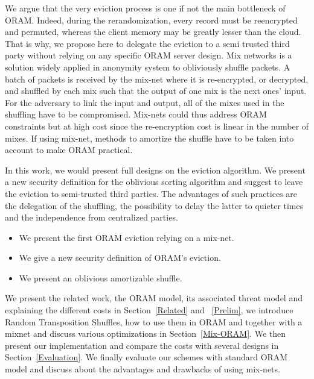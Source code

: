 \documentclass{llncs}
\begin{document}
We argue that the very eviction process is one if not the main bottleneck of ORAM. Indeed, during the rerandomization, every record must be reencrypted and permuted, whereas the client memory may be greatly lesser than the cloud. That is why, we propose here to delegate the eviction to a semi trusted third party without relying on any specific ORAM server design.
Mix networks is a solution widely applied in anonymity system to obliviously shuffle packets. A batch of packets is received by the mix-net where it is re-encrypted, or decrypted, and shuffled by each mix such that the output of one mix is the next ones' input.
For the adversary to link the input and output, all of the mixes used in the shuffling have to be compromised.
Mix-nets could thus address ORAM constraints but at high cost since the re-encryption cost is linear in the number of mixes. If using mix-net, methods to amortize the shuffle have to be taken into account to make ORAM practical.

In this work, we would present full designs on the eviction algorithm. We present a new security definition for the oblivious sorting algorithm and suggest to leave the eviction to semi-trusted third parties.
The advantages of such practices are the delegation of the shuffling, the possibility to delay the latter to quieter times and the independence from centralized parties.

\begin{itemize}
 \item We present the first ORAM eviction relying on a mix-net.
 \item We give a new security definition of ORAM's eviction. %
 \item We present an oblivious amortizable shuffle.
\end{itemize}


We present the related work, the ORAM model, its associated threat model and explaining the different costs in Section~\ref{Related} and ~\ref{Prelim}, we introduce Random Transposition Shuffles, how to use them in ORAM and together with a mixnet and discuss various optimizations in Section~\ref{Mix-ORAM}. We then present our implementation and compare the costs with several designs in Section~\ref{Evaluation}.
We finally evaluate our schemes with standard ORAM model and discuss about the advantages and drawbacks of using mix-nets.
%
\end{document}
